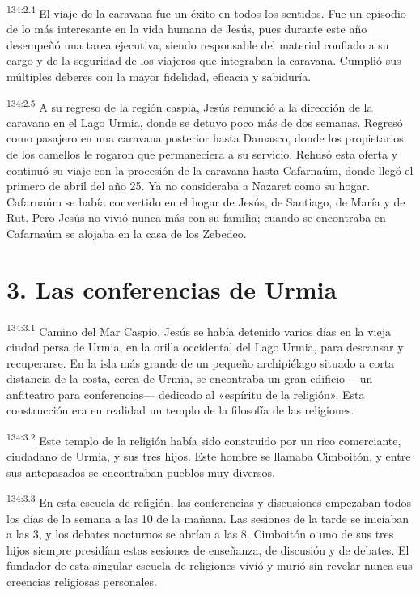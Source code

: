 \par
\textsuperscript{134:2.4} El viaje de la caravana fue un éxito en todos los sentidos. Fue un episodio de lo más interesante en la vida humana de Jesús, pues durante este año desempeñó una tarea ejecutiva, siendo responsable del material confiado a su cargo y de la seguridad de los viajeros que integraban la caravana. Cumplió sus múltiples deberes con la mayor fidelidad, eficacia y sabiduría.

\par
\textsuperscript{134:2.5} A su regreso de la región caspia, Jesús renunció a la dirección de la caravana en el Lago Urmia, donde se detuvo poco más de dos semanas. Regresó como pasajero en una caravana posterior hasta Damasco, donde los propietarios de los camellos le rogaron que permaneciera a su servicio. Rehusó esta oferta y continuó su viaje con la procesión de la caravana hasta Cafarnaúm, donde llegó el primero de abril del año 25. Ya no consideraba a Nazaret como su hogar. Cafarnaúm se había convertido en el hogar de Jesús, de Santiago, de María y de Rut. Pero Jesús no vivió nunca más con su familia; cuando se encontraba en Cafarnaúm se alojaba en la casa de los Zebedeo.

\section*{3. Las conferencias de Urmia}
\par
\textsuperscript{134:3.1} Camino del Mar Caspio, Jesús se había detenido varios días en la vieja ciudad persa de Urmia, en la orilla occidental del Lago Urmia, para descansar y recuperarse. En la isla más grande de un pequeño archipiélago situado a corta distancia de la costa, cerca de Urmia, se encontraba un gran edificio ---un anfiteatro para conferencias--- dedicado al «espíritu de la religión». Esta construcción era en realidad un templo de la filosofía de las religiones.

\par
\textsuperscript{134:3.2} Este templo de la religión había sido construido por un rico comerciante, ciudadano de Urmia, y sus tres hijos. Este hombre se llamaba Cimboitón, y entre sus antepasados se encontraban pueblos muy diversos.

\par
\textsuperscript{134:3.3} En esta escuela de religión, las conferencias y discusiones empezaban todos los días de la semana a las 10 de la mañana. Las sesiones de la tarde se iniciaban a las 3, y los debates nocturnos se abrían a las 8. Cimboitón o uno de sus tres hijos siempre presidían estas sesiones de enseñanza, de discusión y de debates. El fundador de esta singular escuela de religiones vivió y murió sin revelar nunca sus creencias religiosas personales.

